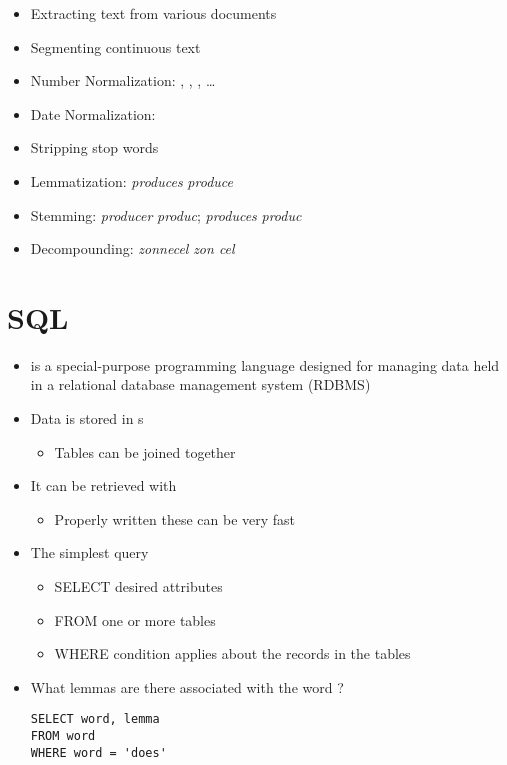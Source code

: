 \documentclass[a4paper,landscape,headrule,footrule,dvips]{foils}
\begin{document}
\begin{CJK}{UTF8}{min}
\begin{itemize}
\item Extracting text from various documents
\item Segmenting continuous text
\item Number Normalization:  
  , , ,  \ldots
\item Date Normalization:    
\item Stripping stop words
\item Lemmatization:  \textit{produces}   \infers \textit{produce}
\item Stemming:  \textit{producer}   \infers \textit{produc}; \textit{produces}   \infers \textit{produc}
\item Decompounding: \textit{zonnecel}  \infers \textit{zon cel}
\end{itemize}


\section{SQL}


\begin{itemize}
\item {} is a special-purpose
programming language designed for managing data held in a relational
database management system (RDBMS)
\item Data is stored in s
  \begin{itemize}
  \item Tables can be joined together
  \end{itemize}
\item It can be retrieved with 
  \begin{itemize}
  \item Properly written these can be very fast
  \end{itemize}
\end{itemize}


\begin{itemize} \addtolength{\itemsep}{-1ex}
\item The simplest query
  \begin{itemize}
  \item SELECT desired attributes
  \item FROM one or more tables
  \item WHERE condition applies about the records in the tables
  \end{itemize}
\item What lemmas are there associated with the word ?
\begin{verbatim}
SELECT word, lemma
FROM word
WHERE word = 'does'
\end{verbatim}


\end{itemize}
\end{CJK}
\end{document}
